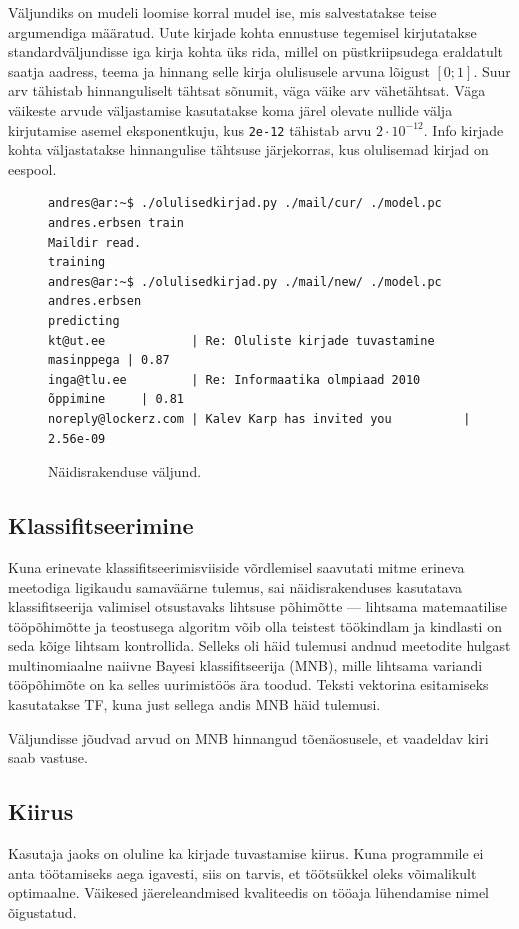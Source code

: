 \documentclass[]{trkuur}
\begin{document}
Väljundiks on mudeli loomise korral mudel ise, mis salvestatakse teise argumendiga määratud.
Uute kirjade kohta ennustuse tegemisel kirjutatakse standardväljundisse iga
kirja kohta üks rida, millel on püstkriipsudega eraldatult saatja aadress,
teema ja hinnang selle kirja olulisusele arvuna lõigust \( [0;1] \). Suur arv
tähistab hinnanguliselt tähtsat sõnumit, väga väike arv vähetähtsat.
Väga väikeste arvude väljastamise kasutatakse koma järel olevate nullide
välja kirjutamise asemel eksponentkuju, kus \texttt{2e-12} tähistab arvu \( 2 \cdot 10^{-12} \).
Info kirjade kohta väljastatakse hinnangulise tähtsuse järjekorras, kus
olulisemad kirjad on eespool.

\begin{figure}[h!]
\vspace{3mm}
\begin{verbatim}
andres@ar:~$ ./olulisedkirjad.py ./mail/cur/ ./model.pc andres.erbsen train
Maildir read.
training
andres@ar:~$ ./olulisedkirjad.py ./mail/new/ ./model.pc andres.erbsen
predicting
kt@ut.ee            | Re: Oluliste kirjade tuvastamine masinppega | 0.87
inga@tlu.ee         | Re: Informaatika olmpiaad 2010 õppimine     | 0.81
noreply@lockerz.com | Kalev Karp has invited you          | 2.56e-09
\end{verbatim}
\vspace{-3mm}
\caption{Näidisrakenduse väljund.}
\label{exampleout}
\end{figure}

\subsection{Klassifitseerimine}
Kuna erinevate klassifitseerimisviiside võrdlemisel saavutati mitme erineva
meetodiga ligikaudu samaväärne tulemus, sai näidisrakenduses kasutatava
klassifitseerija valimisel otsustavaks lihtsuse põhimõtte --- lihtsama
matemaatilise tööpõhimõtte ja teostusega algoritm võib olla teistest töökindlam
ja kindlasti on seda kõige lihtsam kontrollida. Selleks oli häid tulemusi
andnud meetodite hulgast multinomiaalne naiivne Bayesi klassifitseerija (MNB), mille
lihtsama variandi tööpõhimõte on ka selles uurimistöös ära toodud. Teksti
vektorina esitamiseks kasutatakse TF, kuna just sellega andis MNB häid tulemusi.

Väljundisse jõudvad arvud on MNB hinnangud tõenäosusele, et vaadeldav kiri
saab vastuse.

\subsection{Kiirus}
Kasutaja jaoks on oluline ka kirjade tuvastamise kiirus. Kuna programmile ei
anta töötamiseks aega igavesti, siis on tarvis, et töötsükkel oleks võimalikult
optimaalne. Väikesed jäereleandmised kvaliteedis on tööaja lühendamise nimel
õigustatud.
\end{document}
